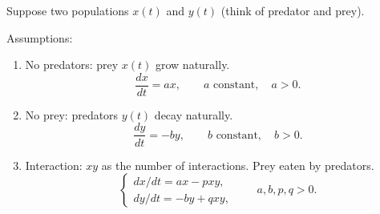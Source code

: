 Suppose two populations $x(t)$ and $y(t)$ (think of predator and prey).

Assumptions:
\begin{enumerate}
  \item No predators: prey $x(t)$ grow naturally.
        \[\frac{dx}{dt}=ax,\qquad a\text{ constant},\quad a>0.\]
  \item No prey: predators $y(t)$ decay naturally.
        \[\frac{dy}{dt}=-by,\qquad b\text{ constant},\quad b>0.\]
  \item Interaction: $xy$ as the number of interactions. Prey eaten by predators.
        \[
          \begin{cases}
            dx/dt=ax-pxy, \\
            dy/dt=-by+qxy,
          \end{cases}
          \qquad a,b,p,q>0.
        \]
\end{enumerate}

